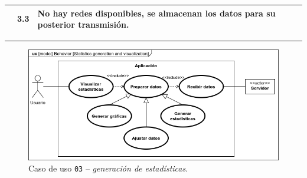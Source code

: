 \begin{table}[H]
\begin{tabularx}{\textwidth}{|c|c|X|}
    \cline{2-3}
                                               & 3.3                                                                                                                                                                                                & \multicolumn{1}{L|}{No hay redes disponibles, se almacenan los datos para su posterior transmisión.}                                                         \\
    \hline
  \end{tabularx}
\end{table}

\noindent\rule{\linewidth}{.2pt}

\begin{figure}[H]
  \centering
  \includegraphics[width=\linewidth]{diagrams/UseCases-UC3 - stats.png}
  \caption{Caso de uso \texttt{03} -- \textit{generación de estadísticas}.}
  \label{uc:stats}
\end{figure}

